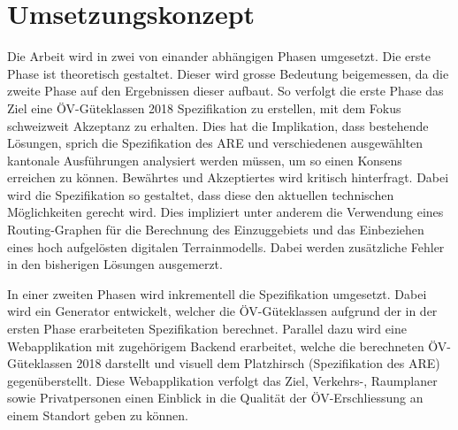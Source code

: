 
\section{Umsetzungskonzept}
\label{Umsetzungskonzept}

Die Arbeit wird in zwei von einander abhängigen Phasen umgesetzt.
Die erste Phase ist theoretisch gestaltet.
Dieser wird grosse Bedeutung beigemessen, da die zweite Phase auf den Ergebnissen dieser aufbaut.
So verfolgt die erste Phase das Ziel eine \acs{ÖV}-Güteklassen 2018 Spezifikation zu erstellen, mit dem Fokus schweizweit Akzeptanz zu erhalten.
Dies hat die Implikation, dass bestehende Lösungen, sprich die Spezifikation des \acl{ARE} und verschiedenen ausgewählten kantonale Ausführungen analysiert werden müssen, um so einen Konsens erreichen zu können.
Bewährtes und Akzeptiertes wird kritisch hinterfragt.
Dabei wird die Spezifikation so gestaltet, dass diese den aktuellen technischen Möglichkeiten gerecht wird.
Dies impliziert unter anderem die Verwendung eines Routing-Graphen für die Berechnung des Einzuggebiets und das Einbeziehen eines hoch aufgelösten digitalen Terrainmodells.
Dabei werden zusätzliche Fehler in den bisherigen Lösungen ausgemerzt.

In einer zweiten Phasen wird inkrementell die Spezifikation umgesetzt.
Dabei wird ein Generator entwickelt, welcher die \acs{ÖV}-Güteklassen aufgrund der in der ersten Phase erarbeiteten Spezifikation berechnet.
Parallel dazu wird eine Webapplikation mit zugehörigem Backend erarbeitet, welche die berechneten \acs{ÖV}-Güteklassen 2018 darstellt und visuell dem Platzhirsch (Spezifikation des \acl{ARE}) gegenüberstellt.
Diese Webapplikation verfolgt das Ziel, Verkehrs-, Raumplaner sowie Privatpersonen einen Einblick in die Qualität der ÖV-Erschliessung an einem Standort geben zu können.

